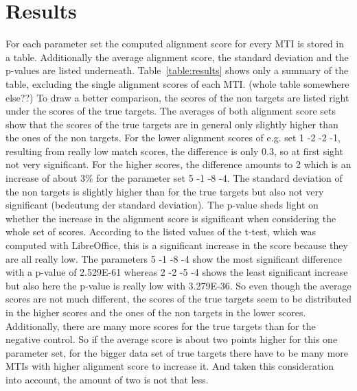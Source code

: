 \documentclass[12pt]{article}
\begin{document}
\section{Results}
For each parameter set the computed alignment score for every MTI is stored in a table. Additionally the average alignment score, the standard deviation and the p-values are listed underneath. Table~\ref{table:results} shows only a summary of the table, excluding the single alignment scores of each MTI. (whole table somewhere else??) To draw a better comparison, the scores of the non targets are listed right under the scores of the true targets. The averages of both alignment score sets show that the scores of the true targets are in general only slightly higher than the ones of the non targets. For the lower alignment scores of e.g. set 1 -2 -2 -1, resulting from really low match scores, the difference is only 0.3, so at first sight not very significant. For the higher scores, the difference amounts to 2 which is an increase of about 3\% for the parameter set 5 -1 -8 -4. The standard deviation of the non targets is slightly higher than for the true targets but also not very significant (bedeutung der standard deviation). The p-value sheds light on whether the increase in the alignment score is significant when considering the whole set of scores.
According to the listed values of the t-test, which was computed with LibreOffice, this is a significant increase in the score because they are all really low. The parameters 5 -1 -8 -4 show the most significant difference with a p-value of 2.529E-61 whereas 2 -2 -5 -4 shows the least significant increase but also here the p-value is really low with 3.279E-36. So even though the average scores are not much different, the scores of the true targets seem to be distributed in the higher scores and the ones of the non targets in the lower scores. Additionally, there are many more scores for the true targets than for the negative control. So if the average score is about two points higher for this one parameter set, for the bigger data set of true targets there have to be many more MTIs with higher alignment score to increase it. And taken this consideration into account, the amount of two is not that less. 
\end{document}
